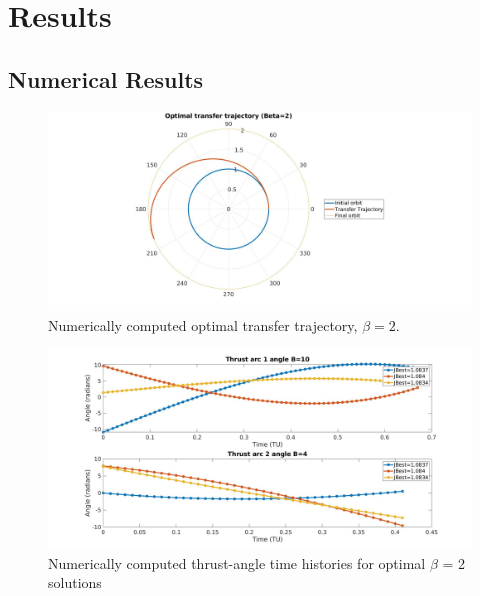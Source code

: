 \chapter{Results}

\section{Numerical Results}

\begin{figure}[H]
    \includegraphics[width=\linewidth]{./jpgs/thrustArcB2.jpg}
    \caption{Numerically computed optimal transfer trajectory, $\beta = 2$.}
    \label{fig:Tarc-B2}
  \end{figure}


\begin{figure}[H]
\includegraphics[width=\linewidth]{./jpgs/thrustAnglesB2.jpg}
\caption{Numerically computed thrust-angle time histories for optimal $\beta$ = 2 solutions  }

\end{figure}

